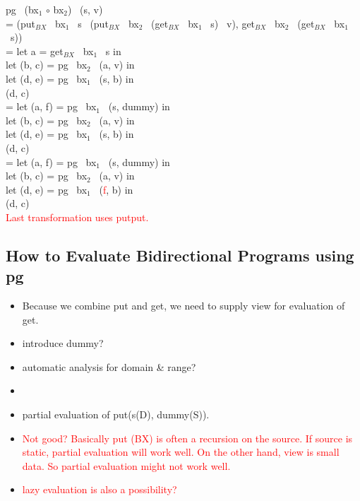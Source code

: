 \documentclass[runningheads]{llncs}
\newcommand{\bxput}[3]{put$_{BX}$ \ {#1} \ {#2} \ {#3}}
\newcommand{\bxget}[2]{get$_{BX}$ \ {#1} \ {#2}}
\newcommand{\pg}[3]{pg \ #1 \ (#2, #3)}
\begin{document}
\noindent
\pg{(bx$_1$ $\circ$ bx$_2$)}{s}{v}\\
= (\bxput{bx$_1$}{s}{(\bxput{bx$_2$}{(\bxget{bx$_1$}{s})}{v})}, \bxget{bx$_2$}{(\bxget{bx$_1$}{s})})\\
= let a = \bxget{bx$_1$}{s} in\\
\hspace{3mm} let (b, c) = \pg{bx$_2$}{a}{v} in\\
\hspace{3mm} let (d, e) = \pg{bx$_1$}{s}{b} in\\
\hspace{3mm} (d, c)\\
= let (a, f) = \pg{bx$_1$}{s}{dummy} in\\
\hspace{3mm} let (b, c) = \pg{bx$_2$}{a}{v} in\\
\hspace{3mm} let (d, e) = \pg{bx$_1$}{s}{b} in\\
\hspace{3mm} (d, c)\\
= let (a, f) = \pg{bx$_1$}{s}{dummy} in\\
\hspace{3mm} let (b, c) = \pg{bx$_2$}{a}{v} in\\
\hspace{3mm} let (d, e) = \pg{bx$_1$}{\textcolor{red}{f}}{b} in\\
\hspace{3mm} (d, c)\\
\textcolor{red}{Last transformation uses putput.}

\subsection{How to Evaluate Bidirectional Programs using pg}

\begin{itemize}
\item Because we combine put and get, we need to supply view for evaluation of get.
\item introduce dummy?
\item automatic analysis for domain \& range?
\item 
\item partial evaluation of put(s(D), dummy(S)).
\item \textcolor{red}{Not good? Basically put (BX) is often a recursion on the source. If source is static, partial evaluation will work well. On the other hand, view is small data. So partial evaluation might not work well.}
\item \textcolor{red}{lazy evaluation is also a possibility?}
\end{itemize}
\end{document}

